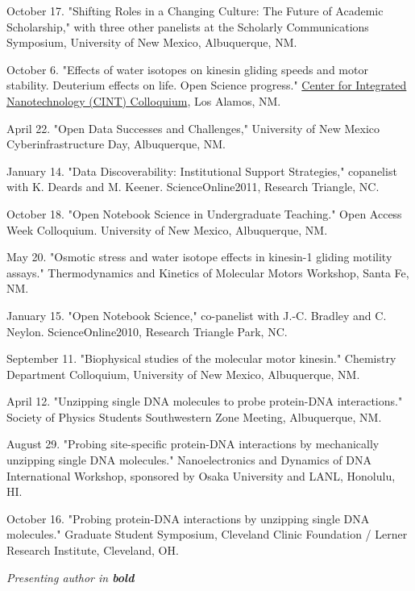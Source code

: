 \documentclass[11pt]{article}
\begin{document}
 October 17. "Shifting Roles in a Changing Culture: The Future of Academic Scholarship," with three other panelists at the Scholarly Communications Symposium, University of New Mexico, Albuquerque, NM.

 October 6. "Effects of water isotopes on kinesin gliding speeds and motor stability.  Deuterium effects on life.  Open Science progress." \href{http://goo.gl/XRjWQ}{Center for Integrated Nanotechnology (CINT) Colloquium}, Los Alamos, NM.

 April 22. "Open Data Successes and Challenges," University of New Mexico Cyberinfrastructure Day, Albuquerque, NM. 

 January 14. "Data Discoverability: Institutional Support Strategies," copanelist with K. Deards and M. Keener.  ScienceOnline2011, Research Triangle, NC.

 October 18. "Open Notebook Science in Undergraduate Teaching." Open Access Week Colloquium.  University of New Mexico, Albuquerque, NM.

 May 20. "Osmotic stress and water isotope effects in kinesin-1 gliding motility assays."  Thermodynamics and Kinetics of Molecular Motors Workshop, Santa Fe, NM.

 January 15. "Open Notebook Science," co-panelist with J.-C. Bradley and C. Neylon.  ScienceOnline2010, Research Triangle Park, NC.

 September 11. "Biophysical studies of the molecular motor kinesin." Chemistry Department Colloquium, University of New Mexico, Albuquerque, NM.

 April 12. "Unzipping single DNA molecules to probe protein-DNA interactions." Society of Physics Students Southwestern Zone Meeting, Albuquerque, NM.

 August 29. "Probing site-specific protein-DNA interactions by mechanically unzipping single DNA molecules." Nanoelectronics and Dynamics of DNA International Workshop, sponsored by Osaka University and LANL, Honolulu, HI.

 October 16. "Probing protein-DNA interactions by unzipping single DNA molecules." Graduate Student Symposium, Cleveland Clinic Foundation / Lerner Research Institute, Cleveland, OH.

\bigskip


\medskip
\noindent\emph{Presenting author in \textbf{bold} \vspace{0.05in}}
\end{document}
